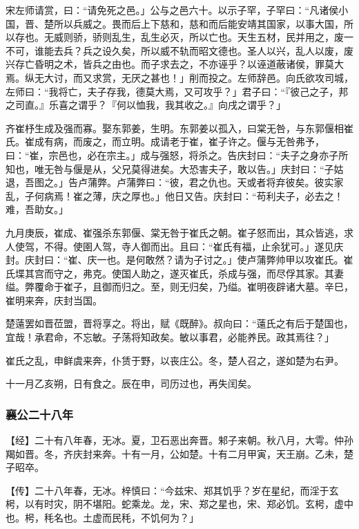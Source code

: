 \documentclass[]{article}
\begin{document}
宋左师请赏，曰：``请免死之邑。」公与之邑六十。以示子罕，子罕曰：``凡诸侯小国，晋、楚所以兵威之。畏而后上下慈和，慈和而后能安靖其国家，以事大国，所以存也。无威则骄，骄则乱生，乱生必灭，所以亡也。天生五材，民并用之，废一不可，谁能去兵？兵之设久矣，所以威不轨而昭文德也。圣人以兴，乱人以废，废兴存亡昏明之术，皆兵之由也。而子求去之，不亦诬乎？以诬道蔽诸侯，罪莫大焉。纵无大讨，而又求赏，无厌之甚也！」削而投之。左师辞邑。向氏欲攻司城，左师曰：``我将亡，夫子存我，德莫大焉，又可攻乎？」君子曰：``『彼己之子，邦之司直。』乐喜之谓乎？『何以恤我，我其收之。』向戌之谓乎？」

齐崔杼生成及强而寡。娶东郭姜，生明。东郭姜以孤入，曰棠无咎，与东郭偃相崔氏。崔成有病，而废之，而立明。成请老于崔，崔子许之。偃与无咎弗予，曰：``崔，宗邑也，必在宗主。」成与强怒，将杀之。告庆封曰：``夫子之身亦子所知也，唯无咎与偃是从，父兄莫得进矣。大恐害夫子，敢以告。」庆封曰：``子姑退，吾图之。」告卢蒲弊。卢蒲弊曰：``彼，君之仇也。天或者将弃彼矣。彼实家乱，子何病焉！崔之薄，庆之厚也。」他日又告。庆封曰：``苟利夫子，必去之！难，吾助女。」

九月庚辰，崔成、崔强杀东郭偃、棠无咎于崔氏之朝。崔子怒而出，其众皆逃，求人使驾，不得。使圉人驾，寺人御而出。且曰：``崔氏有福，止余犹可。」遂见庆封。庆封曰：``崔、庆一也。是何敢然？请为子讨之。」使卢蒲弊帅甲以攻崔氏。崔氏堞其宫而守之，弗克。使国人助之，遂灭崔氏，杀成与强，而尽俘其家。其妻缢。弊覆命于崔子，且御而归之。至，则无归矣，乃缢。崔明夜辟诸大墓。辛巳，崔明来奔，庆封当国。

楚薳罢如晋莅盟，晋将享之。将出，赋《既醉》。叔向曰：``薳氏之有后于楚国也，宜哉！承君命，不忘敏。子荡将知政矣。敏以事君，必能养民。政其焉往？」

崔氏之乱，申鲜虞来奔，仆赁于野，以丧庄公。冬，楚人召之，遂如楚为右尹。

十一月乙亥朔，日有食之。辰在申，司历过也，再失闰矣。

\hypertarget{header-n2250}{%
\subsubsection{襄公二十八年}\label{header-n2250}}

【经】二十有八年春，无冰。夏，卫石恶出奔晋。邾子来朝。秋八月，大雩。仲孙羯如晋。冬，齐庆封来奔。十有一月，公如楚。十有二月甲寅，天王崩。乙未，楚子昭卒。

【传】二十八年春，无冰。梓慎曰：``今兹宋、郑其饥乎？岁在星纪，而淫于玄枵，以有时灾，阴不堪阳。蛇乘龙。龙，宋、郑之星也，宋、郑必饥。玄枵，虚中也。枵，秏名也。土虚而民秏，不饥何为？」
\end{document}
